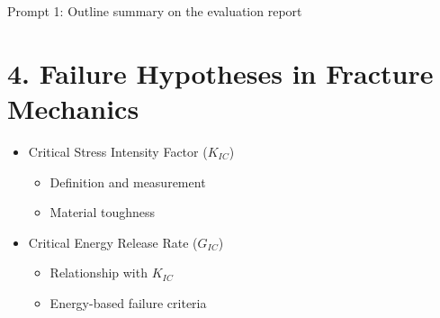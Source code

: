\documentclass[12pt]{article}
\begin{document}
\begin{summarybox}{Prompt 1: Outline summary on the evaluation report}
\section*{4. Failure Hypotheses in Fracture Mechanics }
\begin{itemize}
    \item Critical Stress Intensity Factor ($K_{IC}$)
    \begin{itemize}
        \item Definition and measurement
        \item Material toughness
    \end{itemize}
    \item Critical Energy Release Rate ($G_{IC}$)
    \begin{itemize}
        \item Relationship with $K_{IC}$
        \item Energy-based failure criteria
    \end{itemize}
\end{itemize}
\end{summarybox}
\end{document}
